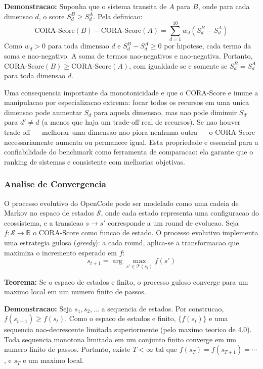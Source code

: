 \textbf{Demonstracao:} Suponha que o sistema transita de $A$ para $B$,
onde para cada dimensao $d$, o score $S_d^B \geq S_d^A$. Pela definicao:
\[
\text{CORA-Score}(B) - \text{CORA-Score}(A) =
\sum_{d=1}^{10} w_d (S_d^B - S_d^A)
\]
Como $w_d > 0$ para toda dimensao $d$ e $S_d^B - S_d^A \geq 0$ por
hipotese, cada termo da soma e nao-negativo. A soma de termos
nao-negativos e nao-negativa. Portanto,
$\text{CORA-Score}(B) \geq \text{CORA-Score}(A)$, com igualdade se e
somente se $S_d^B = S_d^A$ para toda dimensao $d$.

Uma consequencia importante da monotonicidade e que o CORA-Score e imune
a manipulacao por especializacao extrema: focar todos os recursos em uma
unica dimensao pode aumentar $S_d$ para aquela dimensao, mas nao pode
diminuir $S_{d'}$ para $d' \neq d$ (a menos que haja um trade-off real
de recursos). Se nao houver trade-off --- melhorar uma dimensao nao piora
nenhuma outra --- o CORA-Score necessariamente aumenta ou permanece igual.
Esta propriedade e essencial para a confiabilidade do benchmark como
ferramenta de comparacao: ela garante que o ranking de sistemas e
consistente com melhorias objetivas.

\subsubsection{Analise de Convergencia}

O processo evolutivo do OpenCode pode ser modelado como uma cadeia de
Markov no espaco de estados $\mathcal{S}$, onde cada estado representa
uma configuracao do ecossistema, e a transicao $s \to s'$ corresponde a
um round de evolucao. Seja $f: \mathcal{S} \to \mathbb{R}$ o CORA-Score
como funcao de estado. O processo evolutivo implementa uma estrategia
gulosa (\textit{greedy}): a cada round, aplica-se a transformacao que
maximiza o incremento esperado em $f$:
\[
s_{t+1} = \arg\max_{s' \in \mathcal{T}(s_t)} f(s')
\]

\textbf{Teorema:} Se o espaco de estados e finito, o processo guloso
converge para um maximo local em um numero finito de passos.

\textbf{Demonstracao:} Seja $s_1, s_2, \ldots$ a sequencia de estados.
Por construcao, $f(s_{t+1}) \geq f(s_t)$. Como o espaco de estados e
finito, $\{f(s_t)\}$ e uma sequencia nao-decrescente limitada
superiormente (pelo maximo teorico de 4.0). Toda sequencia monotona
limitada em um conjunto finito converge em um numero finito de passos.
Portanto, existe $T < \infty$ tal que $f(s_T) = f(s_{T+1}) = \cdots$,
e $s_T$ e um maximo local.

